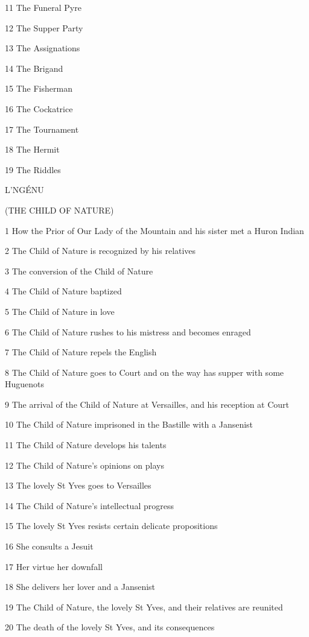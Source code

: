 \documentclass{article}
\begin{document}
\begin{center}
11 The Funeral Pyre 

12 The Supper Party 

13 The Assignations 

14 The Brigand 

15 The Fisherman 

16 The Cockatrice 

17 The Tournament 

18 The Hermit 

19 The Riddles 

\begin{center}
L'NGÉNU 

(THE CHILD OF NATURE) 
\end{center}

\baselineskip=12pt
\leftskip=0pt
1 How the Prior of Our Lady of the Mountain and his sister met a Huron Indian 

2 The Child of Nature is recognized by his relatives 

3 The conversion of the Child of Nature 

4 The Child of Nature baptized 

5 The Child of Nature in love 

6 The Child of Nature rushes to his mistress and becomes enraged 

7 The Child of Nature repels the English 

8 The Child of Nature goes to Court and on the way has supper with some Huguenots 

9 The arrival of the Child of Nature at Versailles, and his reception at Court 

10 The Child of Nature imprisoned in the Bastille with a Jansenist 

11 The Child of Nature develops his talents 

12 The Child of Nature's opinions on plays 

13 The lovely St Yves goes to Versailles 

14 The Child of Nature's intellectual progress 

15 The lovely St Yves resists certain delicate propositions 

16 She consults a Jesuit 

17 Her virtue her downfall 

18 She delivers her lover and a Jansenist 

19 The Child of Nature, the lovely St Yves, and their relatives are reunited 

20 The death of the lovely St Yves, and its consequences\pagebreak{} 


\end{center}
\end{document}
